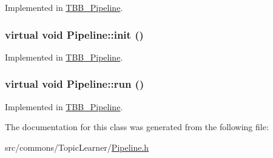 Implemented in \hyperlink{class_t_b_b___pipeline_aa1880e8333868d0d0d15edf202cd6a03}{TBB\_\-Pipeline}.

\hypertarget{class_pipeline_a4ebb79a6018c72d196f480a4300ac302}{
\subsubsection[{init}]{\setlength{\rightskip}{0pt plus 5cm}virtual void Pipeline::init ()}}
\label{class_pipeline_a4ebb79a6018c72d196f480a4300ac302}


Implemented in \hyperlink{class_t_b_b___pipeline_aa4730c25bfcb3a817452024c7d77006f}{TBB\_\-Pipeline}.

\hypertarget{class_pipeline_a6d2bae2931edbb5177e1f1aec27ab9c6}{
\subsubsection[{run}]{\setlength{\rightskip}{0pt plus 5cm}virtual void Pipeline::run ()}}
\label{class_pipeline_a6d2bae2931edbb5177e1f1aec27ab9c6}


Implemented in \hyperlink{class_t_b_b___pipeline_a8f7d9f64786ae4269e213bcefab17d2f}{TBB\_\-Pipeline}.



The documentation for this class was generated from the following file:\begin{DoxyCompactItemize}
\item 
src/commons/TopicLearner/\hyperlink{_pipeline_8h}{Pipeline.h}\end{DoxyCompactItemize}
